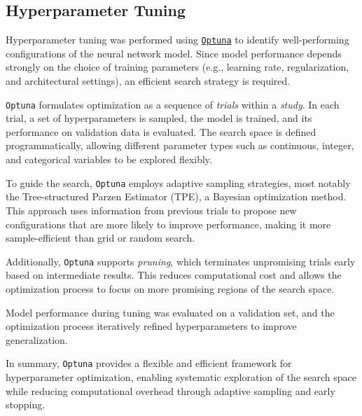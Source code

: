 \subsection{Hyperparameter Tuning}

Hyperparameter tuning was performed using \texttt{\href{https://optuna.org/}{Optuna}} \citep{Akiba2019} to identify well-performing configurations of the neural network model. Since model performance depends strongly on the choice of training parameters (e.g., learning rate, regularization, and architectural settings), an efficient search strategy is required.

\texttt{Optuna} formulates optimization as a sequence of \emph{trials} within a \emph{study}. In each trial, a set of hyperparameters is sampled, the model is trained, and its performance on validation data is evaluated. The search space is defined programmatically, allowing different parameter types such as continuous, integer, and categorical variables to be explored flexibly.

To guide the search, \texttt{Optuna} employs adaptive sampling strategies, most notably the Tree-structured Parzen Estimator (TPE), a Bayesian optimization method. This approach uses information from previous trials to propose new configurations that are more likely to improve performance, making it more sample-efficient than grid or random search.

Additionally, \texttt{Optuna} supports \emph{pruning}, which terminates unpromising trials early based on intermediate results. This reduces computational cost and allows the optimization process to focus on more promising regions of the search space.

Model performance during tuning was evaluated on a validation set, and the optimization process iteratively refined hyperparameters to improve generalization.

In summary, \texttt{Optuna} provides a flexible and efficient framework for hyperparameter optimization, enabling systematic exploration of the search space while reducing computational overhead through adaptive sampling and early stopping.